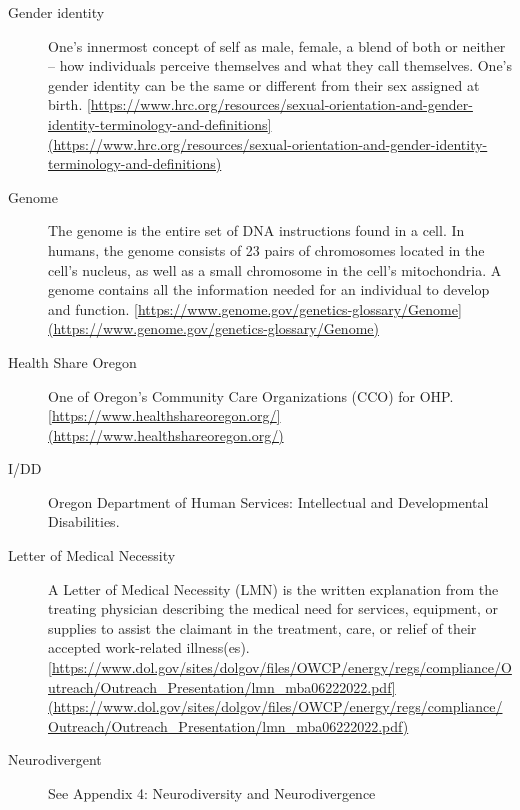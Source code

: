 \documentclass[
  letterpaper,
  DIV=11,
  numbers=noendperiod]{scrreprt}
\begin{document}
\begin{description}
\item[Gender identity]
One's innermost concept of self as male, female, a blend of both or
neither -- how individuals perceive themselves and what they call
themselves. One's gender identity can be the same or different from
their sex assigned at birth.
\href{https://www.hrc.org/resources/sexual-orientation-and-gender-identity-terminology-and-definitions\%5D(https://www.hrc.org/resources/sexual-orientation-and-gender-identity-terminology-and-definitions)}{{[}https://www.hrc.org/resources/sexual-orientation-and-gender-identity-terminology-and-definitions{]}(https://www.hrc.org/resources/sexual-orientation-and-gender-identity-terminology-and-definitions)}
\item[Genome]
The genome is the entire set of DNA instructions found in a cell. In
humans, the genome consists of 23 pairs of chromosomes located in the
cell's nucleus, as well as a small chromosome in the cell's
mitochondria. A genome contains all the information needed for an
individual to develop and function.
\href{https://www.genome.gov/genetics-glossary/Genome\%5D(https://www.genome.gov/genetics-glossary/Genome)}{{[}https://www.genome.gov/genetics-glossary/Genome{]}(https://www.genome.gov/genetics-glossary/Genome)}
\item[Health Share Oregon]
One of Oregon's Community Care Organizations (CCO) for OHP.
\href{https://www.healthshareoregon.org/\%5D(https://www.healthshareoregon.org/)}{{[}https://www.healthshareoregon.org/{]}(https://www.healthshareoregon.org/)}
\item[I/DD]
Oregon Department of Human Services: Intellectual and Developmental
Disabilities.
\item[Letter of Medical Necessity]
A Letter of Medical Necessity (LMN) is the written explanation from the
treating physician describing the medical need for services, equipment,
or supplies to assist the claimant in the treatment, care, or relief of
their accepted work-related illness(es).
\href{https://www.dol.gov/sites/dolgov/files/OWCP/energy/regs/compliance/Outreach/Outreach_Presentation/lmn_mba06222022.pdf\%5D(https://www.dol.gov/sites/dolgov/files/OWCP/energy/regs/compliance/Outreach/Outreach_Presentation/lmn_mba06222022.pdf)}{{[}https://www.dol.gov/sites/dolgov/files/OWCP/energy/regs/compliance/Outreach/Outreach\_Presentation/lmn\_mba06222022.pdf{]}(https://www.dol.gov/sites/dolgov/files/OWCP/energy/regs/compliance/Outreach/Outreach\_Presentation/lmn\_mba06222022.pdf)}
\item[Neurodivergent]
See Appendix 4: Neurodiversity and Neurodivergence

\end{description}
\end{document}
